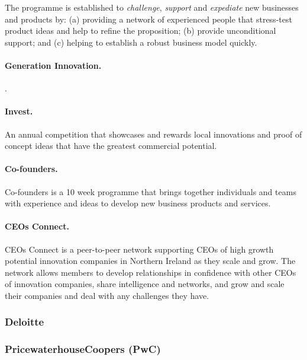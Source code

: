 The programme is established to \emph{challenge}, \emph{support} and \emph{expediate} new businesses and products by: (a) providing a network of experienced people that stress-test product ideas and help to refine the proposition; (b) provide unconditional support; and (c) helping to establish a robust business model quickly.

\paragraph{Generation Innovation.} .

\paragraph{Invest.} An annual competition that showcases and rewards local innovations and proof of concept ideas that have the greatest commercial potential.

\paragraph{Co-founders.} Co-founders is a 10 week programme that brings together individuals and teams with experience and ideas to develop new business products and services.

\paragraph{CEOs Connect.} CEOs Connect is a peer-to-peer network supporting CEOs of high growth potential innovation companies in Northern Ireland as they scale and grow. The network allows members to develop relationships in confidence with other CEOs of innovation companies, share intelligence and networks, and grow and scale their companies and deal with any challenges they have.

\subsubsection{Deloitte}

\subsubsection{PricewaterhouseCoopers (PwC)}